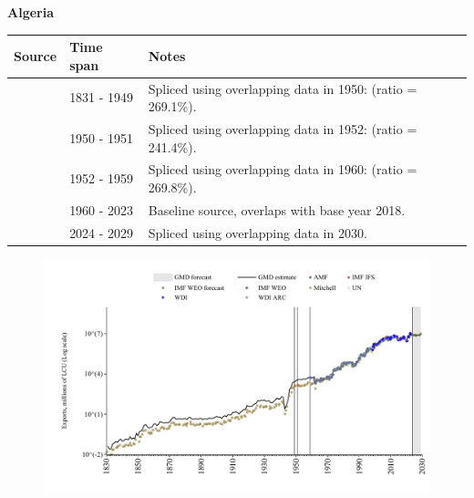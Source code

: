 \documentclass[12pt,a4paper,landscape]{article}
\begin{document}
\begin{adjustbox}{max totalsize={\paperwidth}{\paperheight},center}
\begin{minipage}[t][\textheight][t]{\textwidth}
\vspace*{0.5cm}
{}
\begin{center}
{\Large\bfseries Algeria}
\end{center}
\vspace{0.5cm}
\begin{table}[H]
\centering
\small
\begin{tabular}{|l|l|l|}
\hline
\textbf{Source} & \textbf{Time span} & \textbf{Notes} \\
\hline
\rowcolor{white}\cite{Mitchell}& 1831 - 1949 &Spliced using overlapping data in 1950: (ratio = 269.1\%).\\
\rowcolor{lightgray}\cite{IMF_IFS}& 1950 - 1951 &Spliced using overlapping data in 1952: (ratio = 241.4\%).\\
\rowcolor{white}\cite{Mitchell}& 1952 - 1959 &Spliced using overlapping data in 1960: (ratio = 269.8\%).\\
\rowcolor{lightgray}\cite{WDI}& 1960 - 2023 &Baseline source, overlaps with base year 2018.\\
\rowcolor{white}\cite{IMF_WEO_forecast}& 2024 - 2029 &Spliced using overlapping data in 2030.\\
\hline
\end{tabular}
\end{table}
\begin{figure}[H]
\centering
\includegraphics[width=\textwidth,height=0.6\textheight,keepaspectratio]{graphs/DZA_exports.pdf}
\end{figure}
\end{minipage}
\end{adjustbox}
\end{document}
